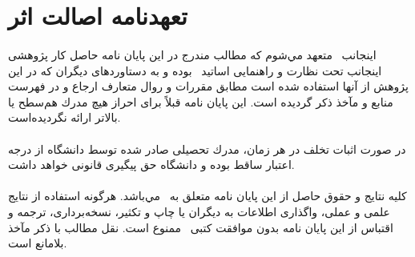 
\thispagestyle{empty}

\section*{تعهدنامه اصالت اثر}

\paragraph*{}
اینجانب  \reportAuthor\ متعهد مي‌شوم كه مطالب مندرج در این پایان نامه حاصل كار پژوهشی اینجانب تحت نظارت و راهنمایی اساتید \universityTitle\ بوده و به دستاوردهای دیگران كه در این پژوهش از آنها استفاده شده است مطابق مقررات و روال متعارف ارجاع و در فهرست منابع و مآخذ ذكر گردیده است. این پایان نامه قبلاً برای احراز هیچ مدرك هم‌سطح یا بالاتر ارائه نگردیده‌است.

\paragraph*{}
در صورت اثبات تخلف در هر زمان، مدرك تحصیلی صادر شده توسط دانشگاه از درجه اعتبار ساقط بوده و دانشگاه حق پیگیری قانونی خواهد داشت.

\paragraph*{}
كلیه نتایج و حقوق حاصل از این پایان نامه متعلق به \universityTitle\ مي‌باشد. هرگونه استفاده از نتایج علمی و عملی، واگذاری اطلاعات به دیگران یا چاپ و تكثیر، نسخه‌برداری، ترجمه و اقتباس از این پایان نامه بدون موافقت كتبی \universityTitle\ ممنوع است. نقل مطالب با ذكر مآخذ بلامانع است.

\paragraph*{} \paragraph*{} \paragraph*{}

\begin{center}
\reportAuthor
\end{center}
